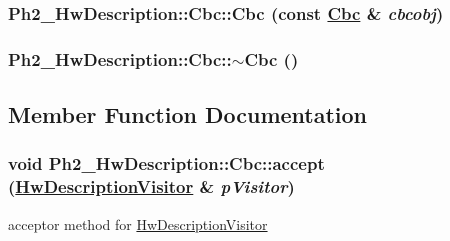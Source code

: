 \hypertarget{class_ph2___hw_description_1_1_cbc_b529cbb8cbbbc3b28a7ca2a472d4aa50}{
\subsubsection[Cbc]{\setlength{\rightskip}{0pt plus 5cm}Ph2\_\-Hw\-Description::Cbc::Cbc (const \hyperlink{class_ph2___hw_description_1_1_cbc}{Cbc} \& {\em cbcobj})}}
\label{class_ph2___hw_description_1_1_cbc_b529cbb8cbbbc3b28a7ca2a472d4aa50}


\hypertarget{class_ph2___hw_description_1_1_cbc_4e641d292073978e6e1b34fa91c13067}{
\subsubsection[$\sim$Cbc]{\setlength{\rightskip}{0pt plus 5cm}Ph2\_\-Hw\-Description::Cbc::$\sim$Cbc ()}}
\label{class_ph2___hw_description_1_1_cbc_4e641d292073978e6e1b34fa91c13067}




\subsection{Member Function Documentation}
\hypertarget{class_ph2___hw_description_1_1_cbc_fb8fe9bb4c72aa33ccc94653fd4bd9fd}{
\subsubsection[accept]{\setlength{\rightskip}{0pt plus 5cm}void Ph2\_\-Hw\-Description::Cbc::accept (\hyperlink{class_hw_description_visitor}{Hw\-Description\-Visitor} \& {\em p\-Visitor})}}
\label{class_ph2___hw_description_1_1_cbc_fb8fe9bb4c72aa33ccc94653fd4bd9fd}


acceptor method for \hyperlink{class_hw_description_visitor}{Hw\-Description\-Visitor} 


